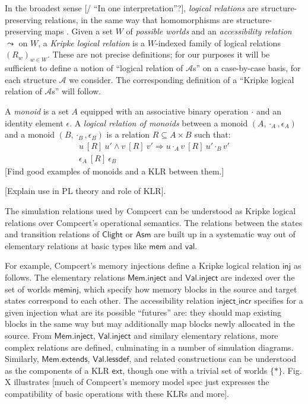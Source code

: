 \documentclass[acmsmall,anonymous]{acmart}
\newcommand{\kw}[1]{\ensuremath{ \textsf{#1} }}
\newcommand{\ifr}[1]{\ [{#1}]\ }
\begin{document}
In the broadest sense [/ ``In one interpretation''?],
\emph{logical relations} are structure-preserving relations,
in the same way that homomorphisms are structure-preserving maps
\citep{lrp}.
Given a set $W$ of \emph{possible worlds}
and an \emph{accessibility relation} $\leadsto$ on $W$,
a \emph{Kripke logical relation} is
a $W$-indexed family of logical relations $(R_w)_{w \in W}$.
These are not precise definitions;
for our purposes it will be sufficient
to define a notion of ``logical relation of $\mathcal{A}$s''
on a case-by-case basis,
for each structure $\mathcal{A}$ we consider.
The corresponding definition of a
``Kripke logical relation of $\mathcal{A}$s''
will follow.

\begin{example}
A \emph{monoid} is a set $A$ equipped with
an associative binary operation $\cdot$ and
an identity element $\epsilon$.
A \emph{logical relation of monoids} between
a monoid $(A, \cdot_A, \epsilon_A)$ and
a monoid $(B, \cdot_B, \epsilon_B)$
is a relation $R \subseteq A \times B$
such that:
\begin{gather*}
u \ifr{R} u' \wedge v \ifr{R} v' \Rightarrow u \cdot_A v \ifr{R} u' \cdot_B v' \\
\epsilon_A \ifr{R} \epsilon_B
\end{gather*}
[Find good examples of monoids and a KLR between them.]
\end{example}

[Explain use in PL theory and role of KLR].

The simulation relations used by Compcert can be understood
as Kripke logical relations over
Compcert's operational semantics.
The relations between
the states and transition relations of \kw{Clight} or \kw{Asm}
are built up in a systematic way out of elementary relations
at basic types like \kw{mem} and \kw{val}.

For example,
Compcert's memory injections
define a Kripke logical relation \kw{inj} as follows.
The elementary relations \kw{Mem.inject} and \kw{Val.inject}
are indexed over the set of worlds \kw{meminj},
which specify how memory blocks in the source and target states
correspond to each other.
The accessibility relation \kw{inject\_incr}
specifies for a given injection
what are its possible ``futures'' are:
they should map existing blocks in the same way
but may additionally map blocks newly allocated in the source.
From \kw{Mem.inject}, \kw{Val.inject} and similary elementary relations,
more complex relations are defined,
culminating in a number of simulation diagrams.
Similarly,
\kw{Mem.extends}, \kw{Val.lessdef}, and related constructions
can be understood as the components of a KLR \kw{ext},
though one with a trivial set of worlds $\{*\}$.
Fig. X illustrates [much of Compcert's memory model spec
just expresses the compatibility of basic operations
with these KLRs and more].
\end{document}

